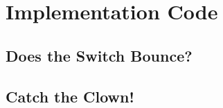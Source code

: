 \documentclass[11pt]{article}
\begin{document}
\clearpage

\section{Implementation Code}

\subsection{Does the Switch Bounce?}
\label{debounce-time-code}


\clearpage
\subsection{Catch the Clown!}
\label{catch-the-clown-code}

\end{document}
